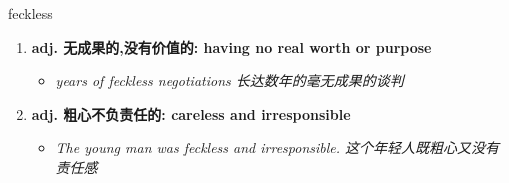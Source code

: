 
\begin{frame}
{\huge feckless}
\begin{center}
\begin{enumerate}\Large
  \item \textbf{adj. 无成果的,没有价值的: having no real worth or purpose}
  \begin{itemize}
    \item \em{\Large{years of feckless negotiations 长达数年的毫无成果的谈判}}
  \end{itemize}
  \item \textbf{adj. 粗心不负责任的: careless and irresponsible}
  \begin{itemize}
    \item \em{\Large{The young man was feckless and irresponsible. 这个年轻人既粗心又没有责任感}}
  \end{itemize}
\end{enumerate}
\end{center}
\end{frame}
